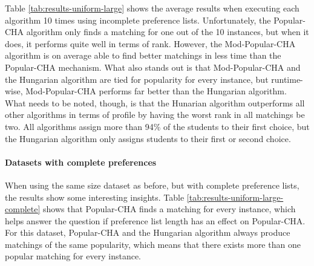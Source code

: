 \begin{table}[h!]
  \centering
  \caption{Average results for large uniform dataset with incomplete preferences.}
  \label{tab:results-uniform-large}
\end{table}

Table \ref{tab:results-uniform-large} shows the average results when executing each algorithm 10 times using incomplete preference lists. Unfortunately, the Popular-CHA algorithm only finds a matching for one out of the 10 instances, but when it does, it performs quite well in terms of rank. However, the Mod-Popular-CHA algorithm is on average able to find better matchings in less time than the Popular-CHA mechanism. What also stands out is that Mod-Popular-CHA and the Hungarian algorithm are tied for popularity for every instance, but runtime-wise, Mod-Popular-CHA performs far better than the Hungarian algorithm. What needs to be noted, though, is that the Hunarian algorithm outperforms all other algorithms in terms of profile by having the worst rank in all matchings be two. All algorithms assign more than 94\% of the students to their first choice, but the Hungarian algorithm only assigns students to their first or second choice.  

\paragraph{Datasets with complete preferences}
When using the same size dataset as before, but with complete preference lists, the results show some interesting insights. Table \ref{tab:results-uniform-large-complete} shows that Popular-CHA finds a matching for every instance, which helps answer the question if preference list length has an effect on Popular-CHA. For this dataset, Popular-CHA and the Hungarian algorithm always produce matchings of the same popularity, which means that there exists more than one popular matching for every instance. 

